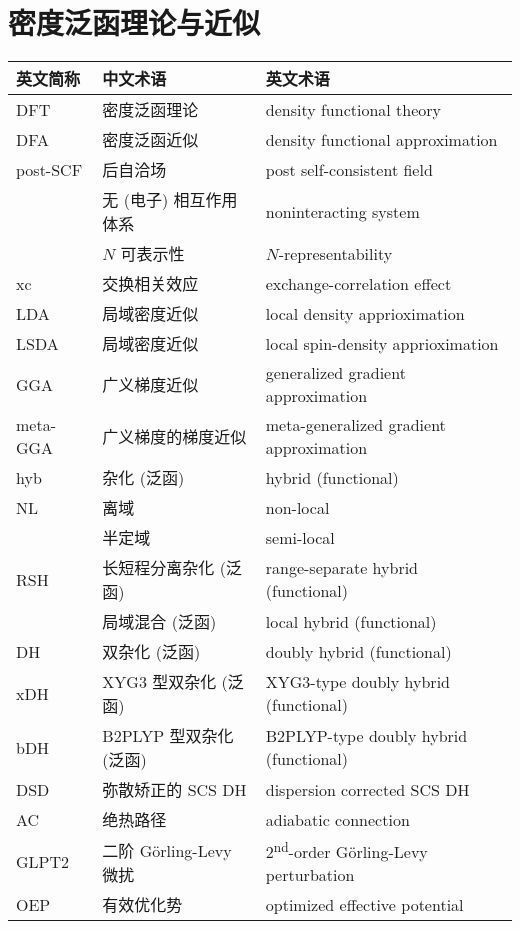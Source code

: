 \endgroup
    
\section*{密度泛函理论与近似}

\begingroup
\setlength{\LTleft}{-20cm plus -1fill}
\setlength{\LTright}{\LTleft}

\begin{longtable}{lll}
    \hline 英文简称 & 中文术语 & 英文术语 \\ \hline \endhead
    \hline \endfoot
    DFT & 密度泛函理论 & density functional theory \\
    DFA & 密度泛函近似 & density functional approximation \\
    post-SCF & 后自洽场 & post self-consistent field \\
    & 无 (电子) 相互作用体系 & noninteracting system \\
    & $N$ 可表示性 & $N$-representability \\
    xc & 交换相关效应 & exchange-correlation effect \\
    LDA & 局域密度近似 & local density apprioximation \\
    LSDA & 局域密度近似 & local spin-density apprioximation \\
    GGA & 广义梯度近似 & generalized gradient approximation \\
    meta-GGA & 广义梯度的梯度近似 & meta-generalized gradient approximation \\
    hyb & 杂化 (泛函) & hybrid (functional) \\
    NL & 离域 & non-local \\
    & 半定域 & semi-local \\
    RSH & 长短程分离杂化 (泛函) & range-separate hybrid (functional) \\
    & 局域混合 (泛函) & local hybrid (functional) \\
    DH & 双杂化 (泛函) & doubly hybrid (functional) \\
    xDH & XYG3 型双杂化 (泛函) & XYG3-type doubly hybrid (functional) \\
    bDH & B2PLYP 型双杂化 (泛函) & B2PLYP-type doubly hybrid (functional) \\
    DSD & 弥散矫正的 SCS DH & dispersion corrected SCS DH \\
    AC & 绝热路径 & adiabatic connection \\
    GLPT2 & 二阶 G{\"o}rling-Levy 微扰 & 2\textsuperscript{nd}-order G{\"o}rling-Levy perturbation \\
    OEP & 有效优化势 & optimized effective potential \\
\end{longtable}

